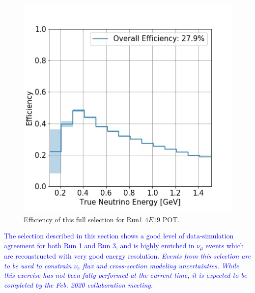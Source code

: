 \begin{figure}
    \centering
    \includegraphics[scale=0.5]{NuMuCCsel/Images/Ryan/finalEfficiency.jpg}
    \caption{Efficiency of this full selection for Run1 $4E19$ POT.}
    \label{fig:NuMUCCsel:ryan:Run1Efficiency}
\end{figure}

\textcolor{blue}{The selection described in this section shows a good level of data-simulation agreement for both Run 1 and Run 3, and is highly enriched in $\nu_{\mu}$ events which are reconstructed with very good energy resolution. \emph{Events from this selection are to be used to constrain $\nu_e$ flux and cross-section modeling uncertainties. While this exercise has not been fully performed at the current time, it is expected to be completed by the Feb. 2020 collaboration meeting.}}
